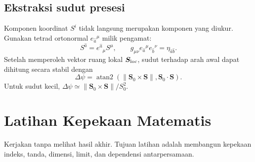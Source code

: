 \documentclass[12pt,a4paper]{report}
\begin{document}
\section{Ekstraksi sudut presesi}

Komponen koordinat $S^i$ tidak langsung merupakan komponen yang diukur. Gunakan
tetrad ortonormal $e_{\hat a}{}^\mu$ milik pengamat:
\[
 S^{\hat a}=e^{\hat a}{}_{\mu}S^\mu,
 \qquad
 g_{\mu\nu}e_{\hat a}{}^\mu e_{\hat b}{}^\nu
 =\eta_{\hat a\hat b}.
\]
Setelah memperoleh vektor ruang lokal $\bm S_{\rm loc}$, sudut terhadap arah awal
dapat dihitung secara stabil dengan
\[
 \Delta\psi
 =\operatorname{atan2}\left(
 \|\bm S_0\times\bm S\|,
 \bm S_0\cdot\bm S
 \right).
\]
Untuk sudut kecil, $\Delta\psi\simeq\|\bm S_0\times\bm S\|/S_0^2$.

\chapter{Latihan Kepekaan Matematis}

Kerjakan tanpa melihat hasil akhir. Tujuan latihan adalah membangun kepekaan indeks,
tanda, dimensi, limit, dan dependensi antarpersamaan.
\end{document}
